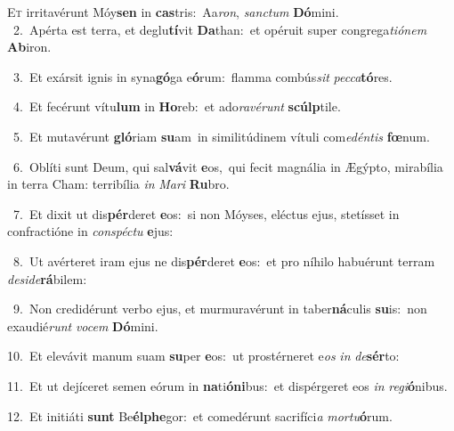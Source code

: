 \lettrine{\initial\textcolor{\initialcolor}{E}}{t} irritavérunt Móy\textbf{sen} in \textbf{cas}\-tris:~\star Aa\-\textit{ron}\-, \textit{sanc}\-\textit{tum} \textbf{Dó}\-mini.\\
{\numbfont\textcolor{\numbcolor}{~2.}}~Apérta est terra, et deglu\-\textbf{tí}\-vit \textbf{Da}\-than:~\star et opéruit super congrega\-\textit{ti}\-\textit{ó}\textit{nem} \textbf{Ab}\-iron.\par
{\numbfont\textcolor{\numbcolor}{~3.}}~Et exársit ignis in syna\-\textbf{gó}\-ga e\-\textbf{ó}\-rum:~\star flamma combús\textit{sit} \textit{pec}\-\textit{ca}\textbf{tó}res.\par
{\numbfont\textcolor{\numbcolor}{~4.}}~Et fecérunt vítu\textbf{lum} in \textbf{Ho}\-reb:~\star et ado\-\textit{ra}\-\textit{vé}\textit{runt} \textbf{scúlp}\-tile.\par
{\numbfont\textcolor{\numbcolor}{~5.}}~Et mutavérunt \textbf{gló}\-riam \textbf{su}\-am~\star in similitúdinem vítuli com\-\textit{e}\-\textit{dén}\textit{tis} \textbf{fœ}\-num.\par
{\numbfont\textcolor{\numbcolor}{~6.}}~Oblíti sunt Deum, qui sal\-\textbf{vá}\-vit \textbf{e}\-os,~\star qui fecit magnália in Ægýpto, mirabília in terra Cham: terribília \textit{in} \textit{Ma}\-\textit{ri} \textbf{Ru}\-bro.\par
{\numbfont\textcolor{\numbcolor}{~7.}}~Et dixit ut dis\-\textbf{pér}\-deret \textbf{e}\-os:~\star si non Móyses, eléctus ejus, stetísset in confractióne in \textit{con}\-\textit{spéc}\textit{tu} \textbf{e}\-jus:\par
{\numbfont\textcolor{\numbcolor}{~8.}}~Ut avérteret iram ejus ne dis\-\textbf{pér}\-deret \textbf{e}\-os:~\star et pro níhilo habuérunt terram \textit{de}\-\textit{si}\textit{de}\textbf{rá}bilem:\par
{\numbfont\textcolor{\numbcolor}{~9.}}~Non credidérunt verbo ejus, et murmuravérunt in taber\-\textbf{ná}\-culis \textbf{su}\-is:~\star non exaudié\textit{runt} \textit{vo}\-\textit{cem} \textbf{Dó}\-mini.\par
{\numbfont\textcolor{\numbcolor}{10.}}~Et elevávit manum suam \textbf{su}\-per \textbf{e}\-os:~\star ut prostérneret e\textit{os} \textit{in} \textit{de}\-\textbf{sér}to:\par
{\numbfont\textcolor{\numbcolor}{11.}}~Et ut dejíceret semen eórum in \textbf{na}\-ti\-\textbf{ó}\-\textbf{ni}bus:~\star et dispérgeret eos \textit{in} \textit{re}\-\textit{gi}\textbf{ó}nibus.\par
{\numbfont\textcolor{\numbcolor}{12.}}~Et initiáti \textbf{sunt} Be\-\textbf{él}\-\textbf{phe}gor:~\star et comedérunt sacrifíci\textit{a} \textit{mor}\-\textit{tu}\textbf{ó}rum.\par

